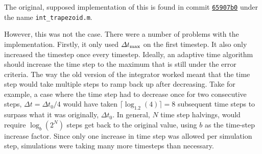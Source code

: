 The original, supposed implementation of this is found in commit \href{https://github.com/TarletonGroup/EasyDD/blob/780a6c41b35687b443d3241674af7393d2140639/int_trapezoid.m}{\texttt{65907b0}} under the name \texttt{int\_trapezoid.m}.

However, this was not the case. There were a number of problems with the implementation. Firstly, it only used $\Delta t_{\textrm{max}}$ on the first timestep. It also only increased the timestep once every timestep. Ideally, an adaptive time algorithm should increase the time step to the maximum that is still under the error criteria. The way the old version of the integrator worked meant that the time step would take multiple steps to ramp back up after decreasing. Take for example, a case where the time step had to decrease once for two consecutive steps, $\Delta t = \Delta t_0/4$ would have taken $\lceil\log_{1.2}(4)\rceil = 8$ subsequent time steps to surpass what it was originally, $\Delta t_0$. In general, $N$ time step halvings, would require $\log_b(2^N)$ steps get back to the original value, using $b$ as the time-step increase factor. Since only one increase in time step was allowed per simulation step, simulations were taking many more timesteps than necessary.

